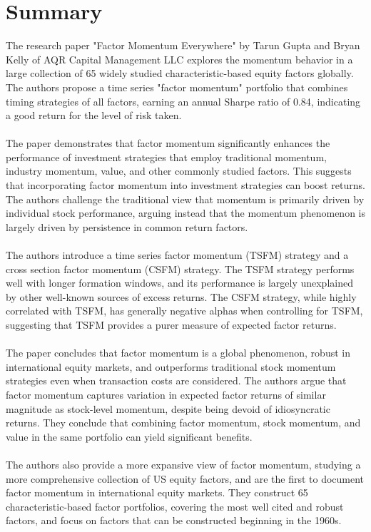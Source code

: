 \documentclass{article}
\begin{document}
\section{Summary}
The research paper "Factor Momentum Everywhere" by Tarun Gupta and Bryan Kelly of AQR Capital Management LLC explores the momentum behavior in a large collection of 65 widely studied characteristic-based equity factors globally. The authors propose a time series "factor momentum" portfolio that combines timing strategies of all factors, earning an annual Sharpe ratio of 0.84, indicating a good return for the level of risk taken. \\
\\
The paper demonstrates that factor momentum significantly enhances the performance of investment strategies that employ traditional momentum, industry momentum, value, and other commonly studied factors. This suggests that incorporating factor momentum into investment strategies can boost returns. The authors challenge the traditional view that momentum is primarily driven by individual stock performance, arguing instead that the momentum phenomenon is largely driven by persistence in common return factors. \\
\\
The authors introduce a time series factor momentum (TSFM) strategy and a cross section factor momentum (CSFM) strategy. The TSFM strategy performs well with longer formation windows, and its performance is largely unexplained by other well-known sources of excess returns. The CSFM strategy, while highly correlated with TSFM, has generally negative alphas when controlling for TSFM, suggesting that TSFM provides a purer measure of expected factor returns. \\
\\
The paper concludes that factor momentum is a global phenomenon, robust in international equity markets, and outperforms traditional stock momentum strategies even when transaction costs are considered. The authors argue that factor momentum captures variation in expected factor returns of similar magnitude as stock-level momentum, despite being devoid of idiosyncratic returns. They conclude that combining factor momentum, stock momentum, and value in the same portfolio can yield significant benefits. \\
\\
The authors also provide a more expansive view of factor momentum, studying a more comprehensive collection of US equity factors, and are the first to document factor momentum in international equity markets. They construct 65 characteristic-based factor portfolios, covering the most well cited and robust factors, and focus on factors that can be constructed beginning in the 1960s. \\
\end{document}
